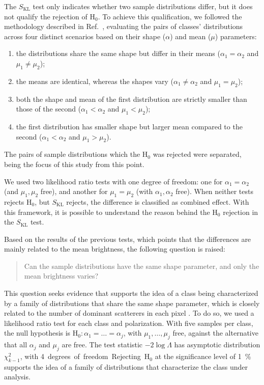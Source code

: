 The $S_{\mathrm{KL}}$ test only indicates whether two sample distributions differ, but it does not qualify the rejection of H$_{0}$.
To achieve this qualification, we followed the methodology described in Ref.~\cite{nascimento2010}, evaluating the pairs of classes' distributions across four distinct scenarios based on their shape ($\alpha$) and mean ($\mu$) parameters:
\begin{enumerate}[label=\roman*.]
    \item the distributions share the same shape but differ in their means ($\alpha_{1} = \alpha_{2}$ and $\mu_{1} \neq \mu_{2}$);
    \item the means are identical, whereas the shapes vary ($\alpha_{1} \neq \alpha_{2}$ and $\mu_{1} = \mu_{2}$);
    \item both the shape and mean of the first distribution are strictly smaller than those of the second ($\alpha_{1}< \alpha_{2}$ and $\mu_{1} < \mu_{2}$);
    \item the first distribution has smaller shape but larger mean  compared to the second ($\alpha_{1} < \alpha_{2}$ and $\mu_{1} > \mu_{2}$).
\end{enumerate}
The pairs of sample distributions which the H$_{0}$ was rejected were separated, being the focus of this study from this point.

We used two likelihood ratio tests with one degree of freedom: 
one for $\alpha_{1}=\alpha_{2}$ (and $\mu_{1},\mu_{2}$ free), 
and another for $\mu_{1}=\mu_{2}$ (with $\alpha_{1},\alpha_{2}$ free).
When neither tests rejects H$_{0}$, but $S_{\mathrm{KL}}$ rejects, the difference is classified as combined effect.
With this framework, it is possible to understand the reason behind the H$_{0}$ rejection in the $S_{\mathrm{KL}}$ test.

Based on the results of the previous tests, which points that the differences are mainly related to the mean brightness, the following question is raised: 
\begin{quote}
Can the sample distributions have the same shape parameter, and only the mean brightness varies?
\end{quote}
This question seeks evidence that supports the idea of a class being characterized by a family of distributions that share the same shape parameter, which is closely related to the number of dominant scatterers in each pixel \cite{yue2021}.
To do so, we used a likelihood ratio test for each class and polarization.
With five samples per class, the null hypothesis is H$_{0}: \alpha_{1} = \dots = \alpha_j$, with $\mu_{1}, \dots, \mu_j$ free, against the alternative that all $\alpha_j$ and $\mu_j$ are free.
The test statistic $-2\log\Lambda$ has asymptotic distribution $\chi^2_{k-1}$, with \qty{4} degrees of freedom.
Rejecting H$_{0}$ at the significance level of \qty{1}{\percent} supports the idea of a family of distributions that characterize the class under analysis.